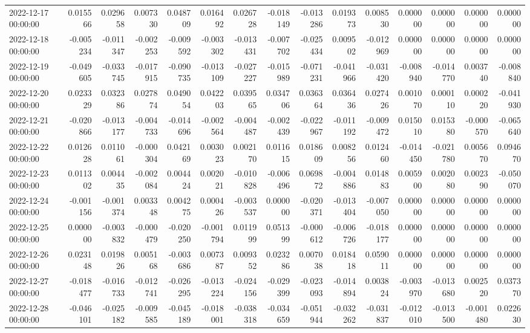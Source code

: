 \begin{tabular}{lrrrrrrrrrrrrrr}
2022-12-17 00:00:00 & 0.015566 & 0.029658 & 0.007330 & 0.048709 & 0.016492 & 0.026728 & -0.018149 & -0.013286 & 0.019373 & 0.008530 & 0.000000 & 0.000000 & 0.000000 & 0.000000 \\
2022-12-18 00:00:00 & -0.005234 & -0.011347 & -0.002253 & -0.009592 & -0.003302 & -0.013431 & -0.007702 & -0.025434 & 0.009502 & -0.012969 & 0.000000 & 0.000000 & 0.000000 & 0.000000 \\
2022-12-19 00:00:00 & -0.049605 & -0.033745 & -0.017915 & -0.090735 & -0.013109 & -0.027227 & -0.015989 & -0.071231 & -0.041966 & -0.031420 & -0.008940 & -0.014770 & 0.003740 & -0.008840 \\
2022-12-20 00:00:00 & 0.023329 & 0.032386 & 0.027874 & 0.049054 & 0.042203 & 0.039565 & 0.034706 & 0.036364 & 0.036436 & 0.027426 & 0.001070 & 0.000110 & 0.000220 & -0.041930 \\
2022-12-21 00:00:00 & -0.020866 & -0.013177 & -0.004733 & -0.014696 & -0.002564 & -0.004487 & -0.002439 & -0.022967 & -0.011192 & -0.009472 & 0.015010 & 0.015380 & -0.000570 & -0.065640 \\
2022-12-22 00:00:00 & 0.012628 & 0.011061 & -0.000304 & 0.042169 & 0.003023 & 0.002170 & 0.011615 & 0.018609 & 0.008256 & 0.012460 & -0.014450 & -0.021780 & 0.005670 & 0.094670 \\
2022-12-23 00:00:00 & 0.011302 & 0.004435 & -0.002084 & 0.004424 & 0.002021 & -0.010828 & -0.006496 & 0.069872 & -0.004886 & 0.014883 & 0.005900 & 0.002080 & 0.002390 & -0.050070 \\
2022-12-24 00:00:00 & -0.001156 & -0.001374 & 0.003348 & 0.004275 & 0.000426 & -0.003537 & 0.000000 & -0.020371 & -0.013404 & -0.007050 & 0.000000 & 0.000000 & 0.000000 & 0.000000 \\
2022-12-25 00:00:00 & 0.000000 & -0.003832 & -0.000479 & -0.020250 & -0.001794 & 0.011999 & 0.051399 & -0.000612 & -0.006726 & -0.018177 & 0.000000 & 0.000000 & 0.000000 & 0.000000 \\
2022-12-26 00:00:00 & 0.023148 & 0.019826 & 0.005168 & -0.003686 & 0.007387 & 0.009352 & 0.023286 & 0.007038 & 0.018418 & 0.059011 & 0.000000 & 0.000000 & 0.000000 & 0.000000 \\
2022-12-27 00:00:00 & -0.018477 & -0.016733 & -0.012741 & -0.026295 & -0.013224 & -0.024156 & -0.029399 & -0.023093 & -0.014894 & 0.003824 & -0.003970 & -0.013680 & 0.002520 & 0.037370 \\
2022-12-28 00:00:00 & -0.046101 & -0.025182 & -0.009585 & -0.045189 & -0.018001 & -0.038318 & -0.034659 & -0.051944 & -0.032262 & -0.031837 & -0.012010 & -0.013500 & -0.001480 & 0.022630 \\

\end{tabular}
